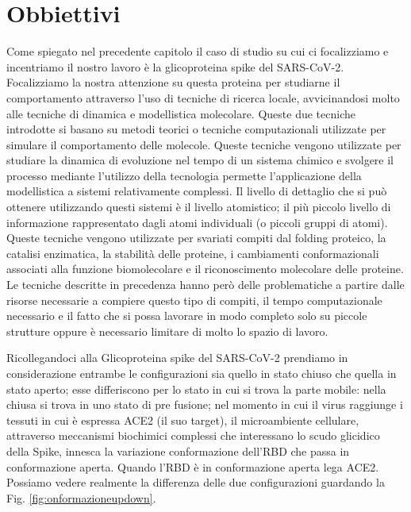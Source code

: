 \chapter{Obbiettivi}\label{chapter:obbiettivi}
Come spiegato nel precedente capitolo il caso di studio su cui ci focalizziamo e incentriamo il nostro lavoro è la glicoproteina spike del SARS-CoV-2. Focalizziamo la nostra attenzione su questa proteina per studiarne il comportamento attraverso l'uso di tecniche di ricerca locale, avvicinandosi molto alle tecniche di dinamica e modellistica molecolare. Queste due tecniche introdotte si basano su metodi teorici o tecniche computazionali utilizzate per simulare il comportamento delle molecole. Queste tecniche vengono utilizzate per studiare la dinamica di evoluzione nel tempo di un sistema chimico e svolgere il processo mediante l'utilizzo della tecnologia permette l'applicazione della modellistica a sistemi relativamente complessi. Il livello di dettaglio che si può ottenere utilizzando questi sistemi è il livello atomistico; il più piccolo livello di informazione rappresentato dagli atomi individuali (o piccoli gruppi di atomi). Queste tecniche vengono utilizzate per svariati compiti dal folding proteico, la catalisi enzimatica, la stabilità delle proteine, i cambiamenti conformazionali associati alla funzione biomolecolare e il riconoscimento molecolare delle proteine. 
Le tecniche descritte in precedenza hanno però delle problematiche a partire dalle risorse necessarie a compiere questo tipo di compiti, il tempo computazionale necessario e il fatto che si possa lavorare in modo completo solo su piccole strutture oppure è necessario limitare di molto lo spazio di lavoro. 
 
Ricollegandoci alla Glicoproteina spike del SARS-CoV-2 prendiamo in considerazione entrambe le configurazioni sia quello in stato chiuso che quella in stato aperto; esse differiscono per lo stato in cui si trova la parte mobile: nella chiusa si trova in uno stato di pre fusione; nel momento in cui il virus raggiunge i tessuti in cui è espressa ACE2 (il suo target), il microambiente cellulare, attraverso meccanismi biochimici complessi che interessano lo scudo glicidico della Spike, innesca la variazione conformazione dell'RBD che passa in conformazione aperta. Quando l'RBD è in conformazione aperta lega ACE2. Possiamo vedere realmente la differenza delle due configurazioni guardando la Fig. \ref{fig:onformazioneupdown}.  

